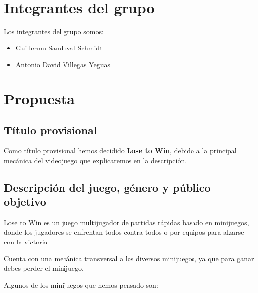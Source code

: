 \documentclass[12pt, spanish]{article}
\makeatletter
\let\thedate\@date
\makeatother
\begin{document}
\begin{titlepage}
    {\large \thedate}\\[0.5cm]
    {\doclicenseThis}

    \vfill

\end{titlepage}


\tableofcontents
\pagebreak


\section{Integrantes del grupo}

Los integrantes del grupo somos:

\begin{itemize}
	\item Guillermo Sandoval Schmidt
	\item Antonio David Villegas Yeguas
\end{itemize}

\section{Propuesta}

\subsection{Título provisional}

Como título provisional hemos decidido \textbf{Lose to Win}, debido a la principal mecánica del videojuego que explicaremos en la descripción.

\subsection{Descripción del juego, género y público objetivo}


Lose to Win es un juego multijugador de partidas rápidas basado en minijuegos, donde los jugadores se enfrentan todos contra todos o por equipos para alzarse con la victoria.

Cuenta con una mecánica transversal a los diversos minijuegos, ya que para ganar debes perder el minijuego.

Algunos de los minijuegos que hemos pensado son:
\end{document}
